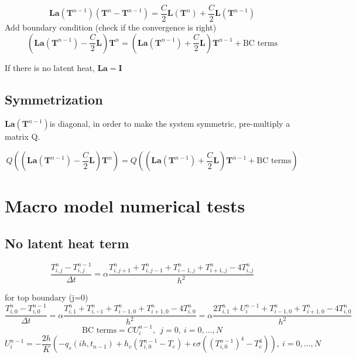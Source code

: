 \documentclass[a4paper,12pt]{article}
\newcommand{\B}[1]{\mathbf{#1}}
\begin{document}
\begin{equation}
\B{La}(\B{T}^{n-1})\left({\B{T}^{n} - \B{T}^{n-1}} \right)= \frac{C}{2}\B{L}(\B{T}^{n})+\frac{C}{2}\B{L}(\B{T}^{n-1})
\end{equation}
Add boundary condition (check if the convergence is right)
\begin{equation}
(\B{La}(\B{T}^{n-1})-\frac{C}{2}\B{L})\B{T}^{n} = (\B{La}(\B{T}^{n-1})+\frac{C}{2}\B{L})\B{T}^{n-1}+ \text{BC terms}
\end{equation}

If there is no latent heat, $\B{La}=\B{I}$

\subsection{Symmetrization}

$\B{La}(\B{T}^{n-1})$is diagonal, in order to make the system symmetric, pre-multiply a matrix Q.

\begin{equation}
Q\left((\B{La}(\B{T}^{n-1})-\frac{C}{2}\B{L})\B{T}^{n} \right)= Q\left((\B{La}(\B{T}^{n-1})+\frac{C}{2}\B{L})\B{T}^{n-1}+ \text{BC terms}\right)
\end{equation}


\section{Macro model numerical tests}

\subsection{No latent heat term}

\begin{equation}
\frac{T_{i,j}^n - T_{i,j}^{n-1}}{\Delta t} = \alpha \frac{T_{i,j+1}^n + T_{i,j-1}^n + T_{i-1,j}^n + T_{i+1,j}^n - 4 T_{i,j}^n }{h^2} 
\end{equation}

for top boundary (j=0)
\begin{equation}
\frac{T_{i,0}^n - T_{i,0}^{n-1}}{\Delta t} = \alpha \frac{T_{i,1}^n + T_{i,-1}^n + T_{i-1,0}^n + T_{i+1,0}^n - 4 T_{i,0}^n }{h^2} =\alpha \frac{2T_{i,1}^n + U_i^{n-1}+ T_{i-1,0}^n + T_{i+1,0}^n - 4 T_{i,0}^n }{h^2} 
\end{equation}
\begin{equation}
 \text{BC terms}=CU_i^{n-1},\ \  j=0,  \ i = 0 , \dots , N
\end{equation}
\begin{equation}
U_i^{n-1}=-\frac{2h}{K}\left(-q_s (ih, t_{n-1}) + h_c (T^{n-1}_{i,0} - T_e) + \epsilon \sigma ( (T^{n-1}_{i,0})^4 - T_e^4)\right), \ i = 0 , \dots , N
\end{equation}
\end{document}
